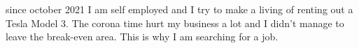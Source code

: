 \versionLanguageStart%
		since october 2021 I am self employed and I try to make a living of renting out a Tesla Model 3.
		The corona time hurt my business a lot and I didn't manage to leave the break-even area.
		This is why I am searching for a job.
\versionLanguageEnd